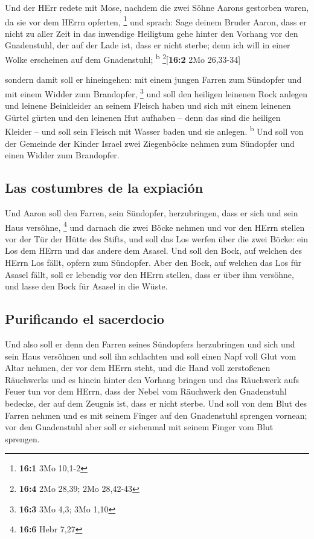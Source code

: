  Und der HErr redete mit Mose, nachdem die zwei Söhne
Aarons gestorben waren, da sie vor dem HErrn opferten, \footnote{\textbf{16:1}
  3Mo 10,1-2}  und sprach: Sage deinem Bruder Aaron, dass
er nicht zu aller Zeit in das inwendige Heiligtum gehe hinter den
Vorhang vor den Gnadenstuhl, der auf der Lade ist, dass er nicht sterbe;
denn ich will in einer Wolke erscheinen auf dem Gnadenstuhl;
\textsuperscript{b} \footnote{\textbf{16:4} 2Mo 28,39; 2Mo 28,42-43}{[}\textbf{16:2}
2Mo 26,33-34{]}

 sondern damit soll er hineingehen: mit einem jungen
Farren zum Sündopfer und mit einem Widder zum Brandopfer, \footnote{\textbf{16:3}
  3Mo 4,3; 3Mo 1,10}  und soll den heiligen leinenen Rock
anlegen und leinene Beinkleider an seinem Fleisch haben und sich mit
einem leinenen Gürtel gürten und den leinenen Hut aufhaben -- denn das
sind die heiligen Kleider -- und soll sein Fleisch mit Wasser baden und
sie anlegen. \textsuperscript{b}  Und soll von der
Gemeinde der Kinder Israel zwei Ziegenböcke nehmen zum Sündopfer und
einen Widder zum Brandopfer.

\hypertarget{las-costumbres-de-la-expiaciuxf3n}{%
\subsection{Las costumbres de la
expiación}\label{las-costumbres-de-la-expiaciuxf3n}}

 Und Aaron soll den Farren, sein Sündopfer, herzubringen,
dass er sich und sein Haus versöhne, \footnote{\textbf{16:6} Hebr 7,27}
 und darnach die zwei Böcke nehmen und vor den HErrn
stellen vor der Tür der Hütte des Stifts,  und soll das
Los werfen über die zwei Böcke: ein Los dem HErrn und das andere dem
Asasel.  Und soll den Bock, auf welchen des HErrn Los
fällt, opfern zum Sündopfer.  Aber den Bock, auf welchen
das Los für Asasel fällt, soll er lebendig vor den HErrn stellen, dass
er über ihm versöhne, und lasse den Bock für Asasel in die Wüste.

\hypertarget{purificando-el-sacerdocio}{%
\subsection{Purificando el sacerdocio}\label{purificando-el-sacerdocio}}

 Und also soll er denn den Farren seines Sündopfers
herzubringen und sich und sein Haus versöhnen und soll ihn schlachten
 und soll einen Napf voll Glut vom Altar nehmen, der vor
dem HErrn steht, und die Hand voll zerstoßenen Räuchwerks und es hinein
hinter den Vorhang bringen  und das Räuchwerk aufs Feuer
tun vor dem HErrn, dass der Nebel vom Räuchwerk den Gnadenstuhl bedecke,
der auf dem Zeugnis ist, dass er nicht sterbe.  Und soll
von dem Blut des Farren nehmen und es mit seinem Finger auf den
Gnadenstuhl sprengen vornean; vor den Gnadenstuhl aber soll er siebenmal
mit seinem Finger vom Blut sprengen.

